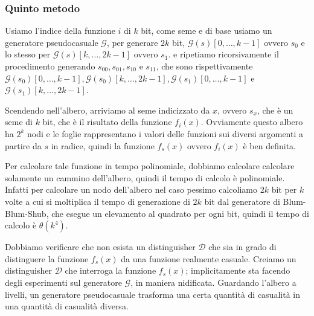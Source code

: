 \subsubsection{Quinto metodo}
Usiamo l'indice della funzione $i$ di $k$ bit, come seme e di base usiamo un 
generatore pseudocasuale $\mathcal{G}$, per generare $2k$ bit,
$\mathcal{G}(s)[0,\dots,k-1]$ ovvero $s_0$ e lo stesso per $\mathcal{G}(s)[k,\dots,2k-1]$
ovvero $s_1$. e ripetiamo ricorsivamente il procedimento generando $s_{00}, s_{01}, s_{10}$
e $s_{11}$, che sono rispettivamente $\mathcal{G}(s_0)[0,\dots,k-1],
\mathcal{G}(s_0)[k,\dots,2k-1], \mathcal{G}(s_1)[0,\dots,k-1]$ e
$\mathcal{G}(s_1)[k,\dots,2k-1]$.
\begin{figure}[H]
  \centering
\end{figure}
Scendendo nell'albero, arriviamo al seme indicizzato da $x$, ovvero
$s_x$, che è un seme di $k$ bit, che è il risultato della funzione
$f_i(x)$. Ovviamente questo albero ha $2^k$ nodi e le foglie rappresentano i 
valori delle funzioni sui diversi argomenti a partire da $s$ in radice,
quindi la funzione $f_s(x)$ ovvero $f_i(x)$ è ben definita.

Per calcolare tale funzione in tempo polinomiale, dobbiamo calcolare
calcolare solamente un cammino dell'albero, quindi il tempo di calcolo
è polinomiale. Infatti per calcolare un nodo dell'albero nel caso pessimo 
calcoliamo $2k$ bit per $k$ volte a cui si moltiplica il tempo di generazione 
di $2k$ bit dal generatore di Blum-Blum-Shub, che esegue un elevamento al 
quadrato per ogni bit, quindi il tempo di calcolo è
$\theta(k^4)$.

Dobbiamo verificare che non esista un distinguisher $\mathcal{D}$ che
sia in grado di distinguere la funzione $f_s(x)$ da una funzione
realmente casuale. Creiamo un distinguisher $\mathcal{D}$ che 
interroga la funzione $f_s(x)$; implicitamente sta facendo degli esperimenti
sul generatore $\mathcal{G}$, in maniera nidificata.
Guardando l'albero a livelli, un generatore pseudocasuale trasforma una 
certa quantità di casualità in una quantità di casualità diversa.

